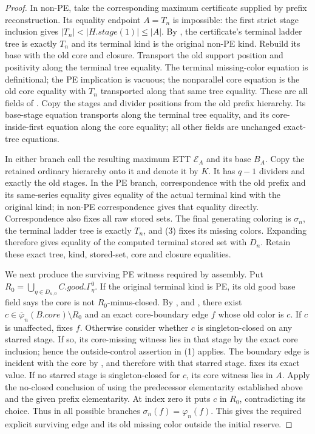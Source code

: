 \begin{proof}
In non-PE, take the corresponding maximum certificate supplied by
prefix reconstruction.  Its equality endpoint $A=T_n$ is impossible:
the first strict stage inclusion gives
$|T_n|<|H.\mathit{stage}(1)|\le |A|$.
By , the certificate's
terminal ladder tree is exactly $T_n$ and its terminal kind is the
original non-PE kind.  Rebuild its base with the old core and closure.
Transport the old support position and positivity along the terminal
tree equality.  The terminal missing-color equation is definitional;
the PE implication is vacuous; the nonparallel core equation is the old
core equality with $T_n$ transported along that same tree equality.
These are all fields of .
Copy the stages and divider positions from the old prefix hierarchy.
Its base-stage equation transports along the terminal tree equality,
and its core-inside-first equation along the core equality; all other
 fields are unchanged exact-tree equations.

In either branch call the resulting maximum ETT $\mathcal E_A$ and
its base $B_A$.  Copy the retained ordinary hierarchy onto it and denote
it by $K$.  It has $q-1$ dividers and exactly the old stages.
In the PE branch, correspondence with the old prefix and its same-series
equality gives equality of the actual terminal kind with the original
kind; in non-PE correspondence gives that equality directly.
Correspondence also fixes all raw stored sets.  The final generating
coloring is $\sigma_n$, the terminal ladder tree is exactly $T_n$, and
(3) fixes its missing colors.  Expanding 
therefore gives equality of the computed terminal stored set with $D_n$.
Retain these exact tree, kind, stored-set, core and closure equalities.

We next produce the surviving PE witness required by assembly.
Put $R_0=\bigcup_{\eta\in D_{n,0}}C.\mathit{good}.\Gamma^0_\eta$.
If the original terminal kind is PE, its old good base field says the
core is not $R_0$-minus-closed.  By
,  and
, there exist
$c\in\overline\varphi_n(B.\mathit{core})\setminus R_0$ and an exact
core-boundary edge $f$ whose old color is $c$.
If $c$ is unaffected,  fixes $f$.
Otherwise consider whether $c$ is singleton-closed on any starred stage.
If so, its core-missing witness lies in that stage by the exact
core inclusion; hence the outside-control assertion in (1) applies.
The boundary edge is incident with the core by ,
and therefore with that starred stage.
 fixes its exact value.
If no starred stage is singleton-closed for $c$, its core witness lies
in $A$.  Apply the no-closed conclusion of  using the
predecessor elementarity established above and the given prefix
elementarity.  At index zero it puts $c$ in $R_0$, contradicting its
choice.  Thus in all possible branches $\sigma_n(f)=\varphi_n(f)$.
This gives the required explicit surviving edge and its old missing
color outside the initial reserve.


\end{proof}
